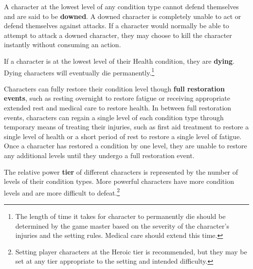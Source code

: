 \documentclass[11pt]{article}
\begin{document}
A character at the lowest level of any condition type cannot defend themselves and are said to be \textbf{downed}.
A downed character is completely unable to act or defend themselves against attacks.
If a character would normally be able to attempt to attack a downed character, they may choose to kill the character instantly without consuming an action.

If a character is at the lowest level of their Health condition, they are \textbf{dying}. Dying characters will eventually die permanently.\footnote{The length of time it takes for character to permanently die should be determined by the game master based on the severity of the character's injuries and the setting rules. Medical care should extend this time.}

Characters can fully restore their condition level though \textbf{full restoration events}, such as resting overnight to restore fatigue or receiving appropriate extended rest and medical care to restore health.
In between full restoration events, characters can regain a single level of each condition type through temporary means of treating their injuries, such as first aid treatment to restore a single level of health or a short period of rest to restore a single level of fatigue.
Once a character has restored a condition by one level, they are unable to restore any additional levels until they undergo a full restoration event.

The relative power \textbf{tier} of different characters is represented by the number of levels of their condition types.
More powerful characters have more condition levels and are more difficult to defeat.\footnote{Setting player characters at the Heroic tier is recommended, but they may be set at any tier appropriate to the setting and intended difficulty.}
\end{document}
